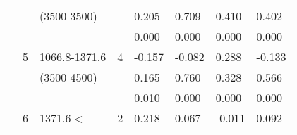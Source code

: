 \begin{table}[p]
\begin{tabular}{cclcllll}
                                                               &                                                                 & (3500-3500)                                                           &                                                                        & 0.205                                       & 0.709                                           & 0.410                                              & 0.402  \\ 
                                                               &                                                                 &                                                                                &                                                                        & 0.000                                       & 0.000                                           & 0.000                                              & 0.000  \\ \cline{5-8}\noalign{\smallskip}
                                                               & 5                                                              & 1066.8-1371.6                                                       & 4                                                                     & -0.157                                      & -0.082                                         & 0.288                                              & -0.133  \\ 
                                                               &                                                                 & (3500-4500)                                                           &                                                                        & 0.165                                       & 0.760                                           & 0.328                                              & 0.566  \\ 
                                                               &                                                                 &                                                                                &                                                                        & 0.010                                       & 0.000                                           & 0.000                                              & 0.000  \\ \cline{5-8}\noalign{\smallskip}
                                                               &  6                                                             & 1371.6$<$                                                             & 2                                                                     & 0.218                                       & 0.067                                           & -0.011                                             & 0.092  \\ 

\end{tabular}
\end{table}
